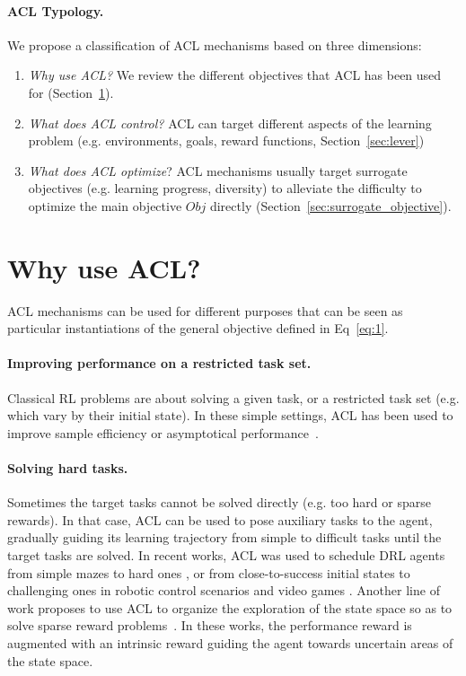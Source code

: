 \documentclass{article}
\begin{document}
\paragraph{ACL Typology.} We propose a classification of ACL mechanisms based on three dimensions:
\begin{enumerate}[leftmargin=0.45cm, nolistsep]
    \item \textit{Why use ACL?} We review the different objectives that ACL has been used for (Section~\ref{sec:main_objective}).
    \item \textit{What does ACL control?} ACL can target different aspects of the learning problem (e.g. environments, goals, reward functions, Section~\ref{sec:lever})
    \item \textit{What does ACL optimize}? ACL mechanisms usually target surrogate objectives (e.g. learning progress, diversity) to alleviate the difficulty to optimize the main objective $Obj$ directly (Section~\ref{sec:surrogate_objective}).
\end{enumerate}




\section{Why use ACL?}
\label{sec:main_objective}
ACL mechanisms can be used for different purposes that can be seen as particular instantiations of the general objective defined in Eq~\ref{eq:1}.

\paragraph{Improving performance on a restricted task set.} Classical RL problems are about solving a given task, or a restricted task set (e.g. which vary by their initial state). In these simple settings, ACL has been used to improve sample efficiency or asymptotical performance~\cite{per,apex,SAUNA}.

\paragraph{Solving hard tasks.} Sometimes the target tasks cannot be solved directly (e.g. too hard or sparse rewards). 
In that case, ACL can be used to pose auxiliary tasks to the agent, gradually guiding its learning trajectory from simple to difficult tasks until the target tasks are solved. In recent works, ACL was used to schedule DRL agents from simple mazes to hard ones \cite{tscl}, or from close-to-success initial states to challenging ones in robotic control scenarios \cite{reverse-cur,BaRC} and video games \cite{montezuma-single-demo}. 
Another line of work proposes to use ACL to organize the exploration of the state space so as to solve sparse reward problems~\cite{countbased,icm,disagreement,pathakdisagreement,rnd}. In these works, the performance reward is augmented with an intrinsic reward guiding the agent towards uncertain areas of the state space.
\end{document}

